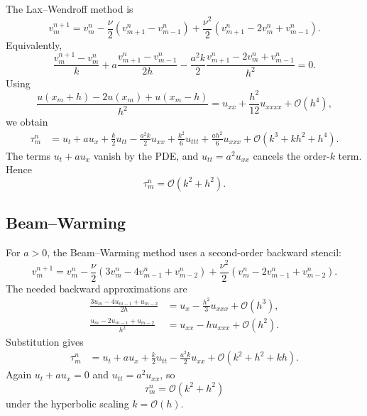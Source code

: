 \documentclass[11pt]{article}
\newcommand{\Oh}{\mathcal{O}}
\begin{document}
The Lax--Wendroff method is
\begin{equation}
    v_m^{n+1}
    =
    v_m^n
    -\frac{\nu}{2}(v_{m+1}^n-v_{m-1}^n)
    +\frac{\nu^2}{2}(v_{m+1}^n-2v_m^n+v_{m-1}^n).
\end{equation}
Equivalently,
\begin{equation}
    \frac{v_m^{n+1}-v_m^n}{k}
    +a\frac{v_{m+1}^n-v_{m-1}^n}{2h}
    -\frac{a^2k}{2}\frac{v_{m+1}^n-2v_m^n+v_{m-1}^n}{h^2}=0.
\end{equation}
Using
\begin{equation}
    \frac{u(x_m+h)-2u(x_m)+u(x_m-h)}{h^2}
    =
    u_{xx}+\frac{h^2}{12}u_{xxxx}+\Oh(h^4),
\end{equation}
we obtain
\begin{align}
    \tau_m^n
    &=
    u_t+a u_x
    +\frac{k}{2}u_{tt}
    -\frac{a^2k}{2}u_{xx}
    +\frac{k^2}{6}u_{ttt}
    +\frac{a h^2}{6}u_{xxx}
    +\Oh(k^3+kh^2+h^4).
\end{align}
The terms $u_t+a u_x$ vanish by the PDE, and
$u_{tt}=a^2u_{xx}$ cancels the order-$k$ term.  Hence
\begin{equation}
    \tau_m^n=\Oh(k^2+h^2).
\end{equation}

\subsection{Beam--Warming}

For $a>0$, the Beam--Warming method uses a second-order backward stencil:
\begin{equation}
    v_m^{n+1}
    =
    v_m^n
    -\frac{\nu}{2}(3v_m^n-4v_{m-1}^n+v_{m-2}^n)
    +\frac{\nu^2}{2}(v_m^n-2v_{m-1}^n+v_{m-2}^n).
\end{equation}
The needed backward approximations are
\begin{align}
    \frac{3u_m-4u_{m-1}+u_{m-2}}{2h}
    &=
    u_x-\frac{h^2}{3}u_{xxx}+\Oh(h^3),\\
    \frac{u_m-2u_{m-1}+u_{m-2}}{h^2}
    &=
    u_{xx}-h u_{xxx}+\Oh(h^2).
\end{align}
Substitution gives
\begin{align}
    \tau_m^n
    &=
    u_t+a u_x
    +\frac{k}{2}u_{tt}
    -\frac{a^2k}{2}u_{xx}
    +\Oh(k^2+h^2+kh).
\end{align}
Again $u_t+a u_x=0$ and $u_{tt}=a^2u_{xx}$, so
\begin{equation}
    \tau_m^n=\Oh(k^2+h^2)
\end{equation}
under the hyperbolic scaling $k=\Oh(h)$.
\end{document}
